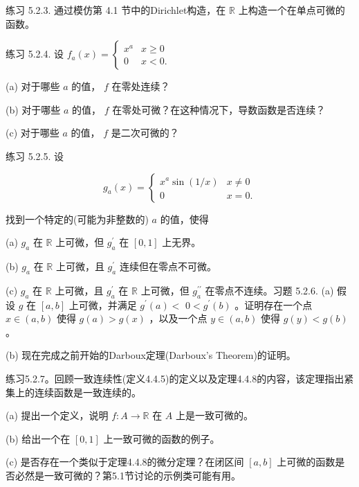 练习 5.2.3. 通过模仿第 4.1 节中的Dirichlet构造，在 \(\mathbb{R}\) 上构造一个在单点可微的函数。

练习 5.2.4. 设 \({f}_{a}\left( x\right)  = \left\{  \begin{array}{ll} {x}^{a} & x \geq  0 \\  0 & x < 0. \end{array}\right.\)

(a) 对于哪些 \(a\) 的值， \(f\) 在零处连续？

(b) 对于哪些 \(a\) 的值， \(f\) 在零处可微？在这种情况下，导数函数是否连续？

(c) 对于哪些 \(a\) 的值， \(f\) 是二次可微的？

练习 5.2.5. 设

\[
{g}_{a}\left( x\right)  = \left\{  \begin{array}{ll} {x}^{a}\sin \left( {1/x}\right) & x \neq  0 \\  0 & x = 0. \end{array}\right.
\]

找到一个特定的(可能为非整数的) \(a\) 的值，使得

(a) \({g}_{a}\) 在 \(\mathbb{R}\) 上可微，但 \({g}_{a}^{\prime }\) 在 \(\left\lbrack  {0,1}\right\rbrack\) 上无界。

(b) \({g}_{a}\) 在 \(\mathbb{R}\) 上可微，且 \({g}_{a}^{\prime }\) 连续但在零点不可微。

(c) \({g}_{a}\) 在 \(\mathbb{R}\) 上可微，且 \({g}_{a}^{\prime }\) 在 \(\mathbb{R}\) 上可微，但 \({g}_{a}^{\prime \prime }\) 在零点不连续。习题 5.2.6. (a) 假设 \(g\) 在 \(\left\lbrack  {a,b}\right\rbrack\) 上可微，并满足 \({g}^{\prime }\left( a\right)  <\)  \(0 < {g}^{\prime }\left( b\right)\) 。证明存在一个点 \(x \in  \left( {a,b}\right)\) 使得 \(g\left( a\right)  > g\left( x\right)\) ，以及一个点 \(y \in  \left( {a,b}\right)\) 使得 \(g\left( y\right)  < g\left( b\right)\) 。

(b) 现在完成之前开始的Darboux定理(Darboux's Theorem)的证明。

练习5.2.7。回顾一致连续性(定义4.4.5)的定义以及定理4.4.8的内容，该定理指出紧集上的连续函数是一致连续的。

(a) 提出一个定义，说明 \(f : A \rightarrow  \mathbb{R}\) 在 \(A\) 上是一致可微的。

(b) 给出一个在 \(\left\lbrack  {0,1}\right\rbrack\) 上一致可微的函数的例子。

(c) 是否存在一个类似于定理4.4.8的微分定理？在闭区间 \(\left\lbrack  {a,b}\right\rbrack\) 上可微的函数是否必然是一致可微的？第5.1节讨论的示例类可能有用。

